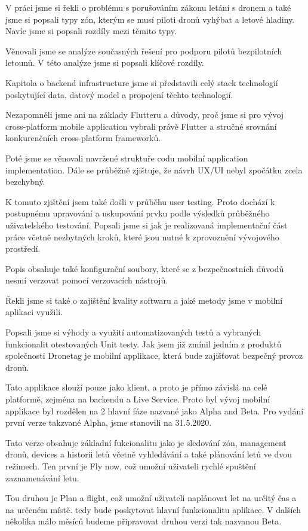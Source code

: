 V práci jsme si řekli o problému s porušováním zákonu letání s dronem a také jsme si popsali typy zón, kterým se musí piloti dronů vyhýbat a letové hladiny.
Navíc jsme si popsali rozdíly mezi těmito typy.

Věnovali jsme se analýze současných řešení pro podporu pilotů bezpilotních letounů.
V této analýze jsme si popsali klíčové rozdíly.

Kapitola o backend infrastructure jsme si představili celý stack technologií poskytující data, datový model a propojení těchto technologií.

Nezapomněli jsme ani na základy Flutteru a důvody, proč jsme si pro vývoj cross-platform mobile application vybrali právě Flutter a stručné srovnání konkurenčních cross-platform frameworků.

Poté jsme se věnovali navržené struktuře codu mobilní application implementation.
Dále se průběžně zjištuje, že návrh UX/UI nebyl zpočátku zcela bezchybný.

K tomuto zjištění jsem také došli v průběhu user testing.
Proto dochází k postupnému upravování a uskupování prvku podle výsledků průběžného uživatelského testování.
Popsali jsme si jak je realizovaná implementační část práce včetně nezbytných kroků, které jsou nutné k zprovoznění vývojového prostředí.

Popis obsahuje také konfigurační soubory, které se z bezpečnostních důvodů nesmí verzovat pomocí verzovacích nástrojů.

Řekli jsme si také o zajištění kvality softwaru a jaké metody jsme v mobilní aplikaci využili.

Popsali jsme si výhody a využití automatizovaných testů a vybraných funkcionalit otestovaných Unit testy.
Jak jsem již zmínil jedním z produktů společnosti Dronetag je mobilní applikace, která bude zajišťovat bezpečný provoz dronů.

Tato applikace slouží pouze jako klient, a proto je přímo závislá na celé platformě, zejména na backendu a Live Service.
Proto byl vývoj mobilní applikace byl rozdělen na 2 hlavní fáze nazvané jako Alpha and Beta.
Pro vydání první verze takzvané Alpha, jsme stanovili na 31.5.2020.

Tato verze obsahuje základní fukcionalitu jako je sledování zón, management dronů, devices a historii letů včetně vyhledávání a také plánování letů ve dvou režimech.
Ten první je Fly now, což umožní uživateli rychlé spuštění zaznamenávání letu.

Tou druhou je Plan a flight, což umožní uživateli naplánovat let na určitý čas a na určeném místě.
tedy bude poskytovat hlavní funkcionalitu aplikace.
V dalších několika málo měsíců budeme připravovat druhou verzi tak nazvanou Beta.

